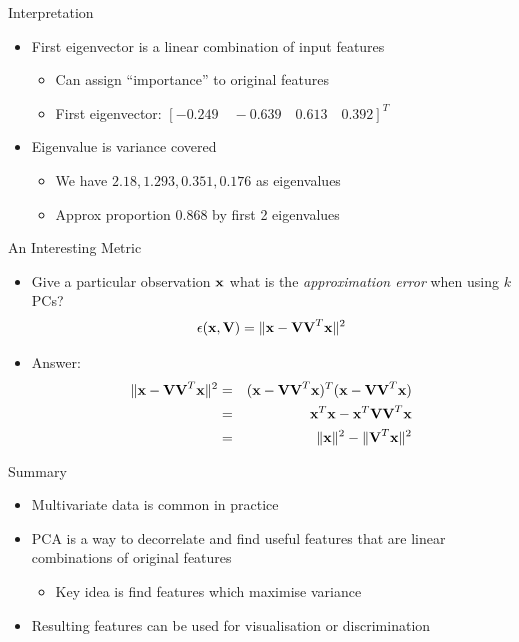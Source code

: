 \documentclass{beamer}
\begin{document}
\begin{frame}{Interpretation} 
\begin{itemize} 
 \item First eigenvector is a linear combination of input features 
 \begin{itemize}
  \item Can assign ``importance'' to original features 
  \item First eigenvector: $[-0.249 \quad -0.639 \quad 0.613 \quad 0.392]^T$
 \end{itemize} 
 \item Eigenvalue is variance covered
 \begin{itemize}
  \item We have $2.18, 1.293, 0.351, 0.176$ as eigenvalues 
  \item Approx proportion $0.868$ by first 2 eigenvalues 
  \end{itemize}
\end{itemize} 
\end{frame}

\begin{frame}{An Interesting Metric} 
\begin{itemize} 
 \item Give a particular observation $\textbf{x}$ what is the \emph{approximation error} when using $k$ PCs?
 \begin{displaymath} 
  \epsilon(\textbf{x}, \textbf{V}) = \|\textbf{x} - \textbf{V}\textbf{V}^T\textbf{x}\|^2
 \end{displaymath}
\item Answer:
\begin{eqnarray*} 
  \|\textbf{x} - \textbf{V}\textbf{V}^T\textbf{x}\|^2 &=& (\textbf{x} - \textbf{V}\textbf{V}^T\textbf{x})^T (\textbf{x} - \textbf{V}\textbf{V}^T\textbf{x}) \\ 
   &=& \textbf{x}^T\textbf{x} - \textbf{x}^T\textbf{V}\textbf{V}^T\textbf{x} \\ 
   &=& \|\textbf{x}\|^2 - \|\textbf{V}^T\textbf{x}\|^2
\end{eqnarray*}
\end{itemize}
\end{frame}

\begin{frame}{Summary} 
\begin{itemize}
 \item Multivariate data is common in practice 
 \item PCA is a way to decorrelate and find useful features that are linear combinations of original features 
 \begin{itemize}
  \item Key idea is find features which maximise variance 
 \end{itemize}
 \item Resulting features can be used for visualisation or discrimination 
\end{itemize}
\end{frame}
\end{document}

